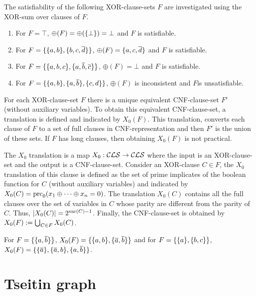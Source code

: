 \documentclass{report}
\begin{document}
\begin{examp}\label{exp:xorcls}
The satisfiability of the following XOR-clause-sets $F$ are investigated using the XOR-sum over clauses of $F$.
  \begin{enumerate}
  \item For $F=\top$, $ \oplus(F)= \oplus(\{ \bot \})=\bot$ and $F$ is satisfiable.
  \item For $F=\{ \{ a,b \},\{ b,c,\overline d \} \}$, $ \oplus(F) = \{ a,c,\overline d \}$ and $F$ is satisfiable.
  \item For $F=\{ \{ a,b,c \},\{ a, \overline b, \overline c \} \}$, $ \oplus(F) = \bot$ and $F$ is satisfiable.  
  \item  For $F=\{ \{ a,b \},\{ a, \overline b \},\{ c,d \} \}$, $\oplus (F)$ is inconsistent and $F$is unsatisfiable.
  \end{enumerate}
\end{examp}

For each XOR-clause-set $F$ there is a unique equivalent CNF-clause-set $F'$ (without auxiliary variables). To obtain this equivalent CNF-clause-set, a translation is defined and indicated by $X_0(F)$. This translation, converts each clause of $F$ to a set of full clauses in CNF-representation and then $F'$ is the union of these sets. If $F$ has long clauses, then obtaining $X_0(F)$ is not practical.

\begin{defi}\label{def:x0tr}
\cite{h8} The $X_0$ translation is a map $X_0: \mathcal{CLS} \rightarrow \mathcal{CLS}$ where the input is an XOR-clause-set and the output is a  CNF-clause-set. Consider an XOR-clause $C \in F$, the $X_0$ translation of this clause is defined as the set of prime implicates of the boolean function for $C$ (without auxiliary variables) and indicated by $X_0(C)=\operatorname{prc}_0(x_1 \oplus \dots \oplus x_n = 0)$. The translation $X_0(C)$ contains all the full clauses over the set of variables in $C$ whose parity are different from the parity of $C$. Thus, $\lvert X_0(C) \rvert=2^{\operatorname{var}(C)-1}$. Finally, the CNF-clause-set is obtained by $X_0(F) := \bigcup_{C \in F} X_0(C)$.
\end{defi} 

\begin{examp}\label{exp:X0}
For $F=\{ \{ a,\overline b \} \}$, $X_0(F)= \{ \{ a,b \},\{ \overline a,\overline b \} \}$ and for $F=\{ \{ a \},\{ b,c \} \}$, $X_0(F)=\{ \{ \overline a \},\{ \overline a, b \}, \{ a, \overline b \} \}$.
\end{examp}

\section{Tseitin graph}
\label{sec:Tseitin graph}
\end{document}
